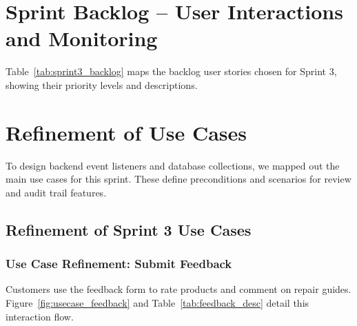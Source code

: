 \documentclass[12pt,a4paper]{report}
\begin{document}
\section{Sprint Backlog -- User Interactions and Monitoring}

Table~\ref{tab:sprint3_backlog} maps the backlog user stories chosen for Sprint 3, showing their priority levels and descriptions.

\renewcommand{\arraystretch}{1.3}
\setlength{\tabcolsep}{8pt}

\begin{table}[!htbp]
\centering
\caption{User stories for Release 3 (User Interactions and Monitoring)}
\label{tab:sprint3_backlog}
\end{table}

\section{Refinement of Use Cases}

To design backend event listeners and database collections, we mapped out the main use cases for this sprint. These define preconditions and scenarios for review and audit trail features.

\subsection{Refinement of Sprint 3 Use Cases}

\subsubsection{Use Case Refinement: Submit Feedback}

Customers use the feedback form to rate products and comment on repair guides. Figure~\ref{fig:usecase_feedback} and Table~\ref{tab:feedback_desc} detail this interaction flow.
\end{document}
